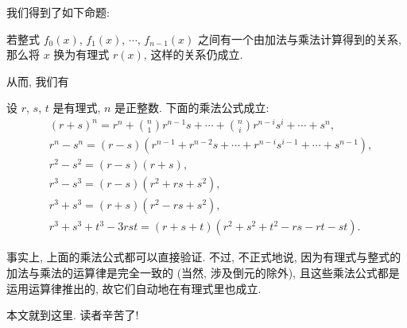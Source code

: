 我们得到了如下命题:
\begin{proposition}
    若整式 $f_0 (x)$, $f_1 (x)$, $\cdots$, $f_{n-1} (x)$ 之间有一个由加法与乘法计算得到的关系, 那么将 $x$ 换为有理式 $r(x)$, 这样的关系仍成立.
\end{proposition}

从而, 我们有
\begin{proposition}
    设 $r$, $s$, $t$ 是有理式, $n$ 是正整数. 下面的乘法公式成立:
    \begin{align*}
         & (r + s)^{n} = r^n + \binom{n}{1} r^{n-1} s + \cdots + \binom{n}{i} r^{n-i} s^i + \cdots + s^n, \\
         & r^n - s^n = (r - s)(r^{n-1} + r^{n-2} s + \cdots + r^{n-i} s^{i-1} + \cdots + s^{n-1}),        \\
         & r^2 - s^2 = (r - s)(r + s),                                                                    \\
         & r^3 - s^3 = (r - s)(r^2 + rs + s^2),                                                           \\
         & r^3 + s^3 = (r + s)(r^2 - rs + s^2),                                                           \\
         & r^3 + s^3 + t^3 - 3rst = (r + s + t)(r^2 + s^2 + t^2 - rs - rt - st).
    \end{align*}
\end{proposition}

\begin{remark}
    事实上, 上面的乘法公式都可以直接验证. 不过, 不正式地说, 因为有理式与整式的加法与乘法的运算律是完全一致的 (当然, 涉及倒元的除外), 且这些乘法公式都是运用运算律推出的, 故它们自动地在有理式里也成立.
\end{remark}

本文就到这里. 读者辛苦了!
